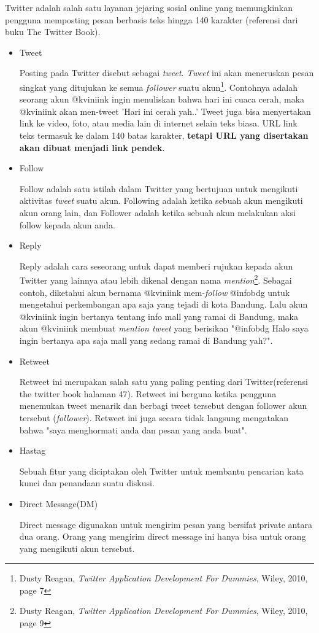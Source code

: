 Twitter adalah salah satu layanan jejaring sosial online yang memungkinkan pengguna memposting pesan berbasis teks hingga 140 karakter (referensi dari buku The Twitter Book).
\begin{itemize}
	\item Tweet 
	
	Posting pada Twitter disebut sebagai \textit{tweet}. \textit{Tweet} ini akan meneruskan pesan singkat yang ditujukan ke semua \textit{follower} suatu akun\footnote{Dusty Reagan, \textit{Twitter Application Development For Dummies}, Wiley, 2010, page 7}. Contohnya adalah seorang akun @kviniink ingin menuliskan bahwa hari ini cuaca cerah, maka @kviniink akan men-tweet 'Hari ini cerah yah..' Tweet juga bisa menyertakan link ke video, foto, atau media lain di internet selain teks biasa. URL link teks termasuk ke dalam 140 batas karakter, \textbf{tetapi URL yang disertakan akan dibuat menjadi link pendek}.
	\item Follow
	
	Follow adalah satu istilah dalam Twitter yang bertujuan untuk mengikuti aktivitas \textit{tweet} suatu akun. Following adalah ketika sebuah akun mengikuti akun orang lain, dan Follower adalah ketika sebuah akun melakukan aksi follow kepada akun anda.
	\item Reply 
	
	Reply adalah cara seseorang untuk dapat memberi rujukan kepada akun Twitter yang lainnya atau lebih dikenal dengan nama \textit{mention}\footnote{Dusty Reagan, \textit{Twitter Application Development For Dummies}, Wiley, 2010, page 9}. Sebagai contoh, diketahui akun bernama @kviniink mem-\textit{follow} @infobdg untuk mengetahui perkembangan apa saja yang tejadi di kota Bandung. Lalu akun @kviniink ingin bertanya tentang info mall yang ramai di Bandung, maka akun @kviniink membuat \textit{mention tweet} yang berisikan "@infobdg Halo saya ingin bertanya apa saja mall yang sedang ramai di Bandung yah?".
	\item Retweet
	
	Retweet ini merupakan salah satu yang paling penting dari Twitter(referensi the twitter book halaman 47). Retweet ini berguna ketika pengguna menemukan tweet menarik dan berbagi tweet tersebut dengan follower akun tersebut (\textit{follower}). Retweet ini juga secara tidak langsung mengatakan bahwa "saya menghormati anda dan pesan yang anda buat".
	
	\item Hastag
	
	Sebuah fitur yang diciptakan oleh Twitter untuk membantu pencarian kata kunci dan penandaan suatu diskusi.
	
	\item Direct Message(DM)
	
	Direct message digunakan untuk mengirim pesan yang bersifat private antara dua orang. Orang yang mengirim direct message ini hanya bisa untuk orang yang mengikuti akun tersebut.
\end{itemize}


